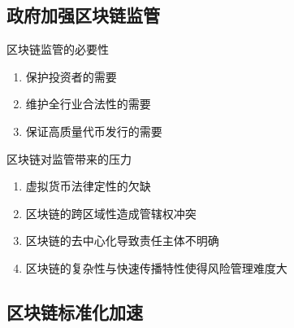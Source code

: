 \documentclass[11pt]{beamer}
\begin{document}
\subsection{政府加强区块链监管}
\begin{frame}{区块链监管的必要性}
	\begin{enumerate}
		\item  保护投资者的需要
		\item  维护全行业合法性的需要
		\item 保证高质量代币发行的需要
	\end{enumerate}
\end{frame}
\begin{frame}{区块链对监管带来的压力}
	\begin{enumerate}
		\item 虚拟货币法律定性的欠缺
		\item 区块链的跨区域性造成管辖权冲突
		\item 区块链的去中心化导致责任主体不明确
		\item 区块链的复杂性与快速传播特性使得风险管理难度大
	\end{enumerate}
\end{frame}

\subsection{区块链标准化加速}
\end{document}

